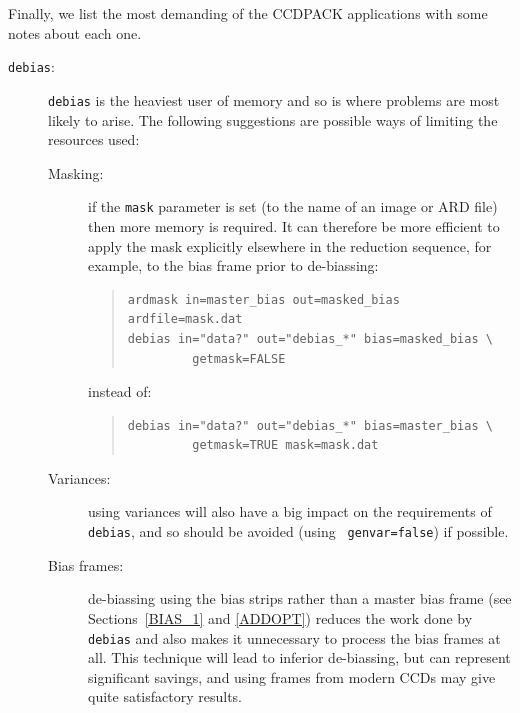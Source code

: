 \documentclass[twoside,11pt]{article}
\begin{document}
Finally, we list the most demanding of the CCDPACK applications with some
notes about each one.

\begin{description}

  \item[{\tt debias}:] {\tt debias} is the heaviest user of memory and so
   is where problems are most likely to arise.
   The following suggestions are possible ways of limiting the resources
   used:

  \begin{description}

    \item[Masking:] if the {\tt mask} parameter is set (to the name of an
     image or ARD file) then more memory is required.
     It can therefore be more efficient to apply the mask explicitly elsewhere
     in the reduction sequence, for example, to the bias frame prior to
     de-biassing:

    \begin{quote}
    \begin{verbatim}
ardmask in=master_bias out=masked_bias ardfile=mask.dat 
debias in="data?" out="debias_*" bias=masked_bias \
         getmask=FALSE 
\end{verbatim}
    \end{quote}

     instead of:

    \begin{quote}
    \begin{verbatim}
debias in="data?" out="debias_*" bias=master_bias \
         getmask=TRUE mask=mask.dat
\end{verbatim}
    \end{quote}

    \item[Variances:] using variances will also have a big impact on the
     requirements of {\tt debias}, and so should be avoided (using {\tt
     genvar=false}) if possible.

    \item[Bias frames:] de-biassing using the bias strips rather than 
     a master bias frame (see Sections~\ref{BIAS_1} and \ref{ADDOPT})
     reduces the work done by {\tt debias} and also makes it unnecessary
     to process the bias frames at all.
     This technique will lead to inferior de-biassing, but can represent
     significant savings, and using frames from modern CCDs may give quite
     satisfactory results.

  \end{description}


\end{description}
\end{document}
